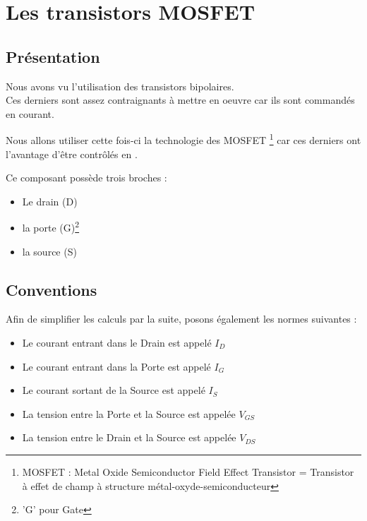 

     \chapter{Les transistors MOSFET}

     \section{Présentation}

     Nous avons vu l'utilisation des transistors bipolaires. \\
     Ces derniers sont assez contraignants à mettre en oeuvre car ils sont commandés en courant.

     Nous allons utiliser cette fois-ci la technologie des MOSFET \footnote{MOSFET : Metal Oxide Semiconductor Field Effect Transistor = Transistor à effet de champ à structure métal-oxyde-semiconducteur} car ces derniers ont l'avantage d'être contrôlés en .

     Ce composant possède trois broches : 
     
     \begin{itemize}
     
       \item Le drain (D)
       \item la porte (G)\footnote{'G' pour Gate}
       \item la source (S)
     
     \end{itemize}
     
     
     \section{Conventions}
     
     Afin de simplifier les calculs par la suite, posons également les normes suivantes : 
     
     \begin{itemize}
     
       \item Le courant entrant dans le Drain est appelé $I_{D}$
       \item Le courant entrant dans la Porte est appelé $I_{G}$
       \item Le courant sortant de la Source est appelé $I_{S}$

       \item La tension entre la Porte et la Source est appelée $V_{GS}$
       \item La tension entre le Drain et la Source est appelée $V_{DS}$
     \end{itemize}
     
